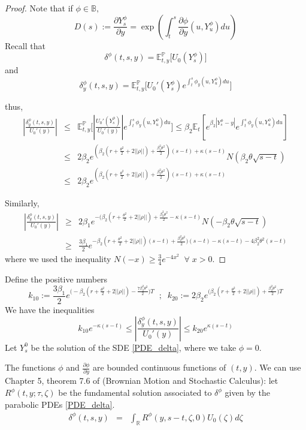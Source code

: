 \documentclass[11pt, psfig]{article}
\theoremstyle{definition}
\theoremstyle{remark}
\numberwithin{equation}{section}
\def\sP{\mathbb{P}}
\def\sR{\mathbb{R}}
\def\sR{\mathbb{R}}
\def\sE{\mathbb{E}}
\newcommand{\be}{\begin{equation}}
\newcommand{\ee}{\end{equation}}
\begin{document}
\begin{proof}
Note that if $\phi \in \mathbb{B},$ 
\be
D(s) :=\frac{\partial Y_s^{\phi}}{\partial y} = \exp\left( \int_t^s \frac{ \partial \phi}{\partial y}(u,Y_u^{\phi}) du  \right)
\ee
Recall that $$ \delta^{\phi}(t,s,y) =  \sE_{t,y}^{\sP}\bigg[U_0({Y}^{\phi}_s)\bigg]$$ and
$$ \delta_y^{\phi}(t,s,y) =  \sE_{t,y}^{\sP}\bigg[U_0'({Y}^{\phi}_s)e^{\int_t^s \phi_y(u,Y_u^{\phi})du}\bigg]$$



thus,
\begin{eqnarray*}
| \frac{ \delta_y^{\phi}(t,s,y)}{U_0'(y)} | & \leq &  \sE_{t,y}^{\sP}\bigg[|\frac{U_0'({Y}^{\phi}_s)}{U_0'(y)}| e^{\int_t^s \phi_y(u,Y_u^{\phi})du}\bigg]
\leq  \beta_2\sE_t[ e^{ \beta_2 |Y_s^{\phi} -y | }  e^{\int_t^s \phi_{y} (u, Y_u^{\phi}) du} ] \\
  &\leq &2\beta_2 e^{ (\beta_2 (r+\frac{\theta^2}{2}+2||\rho||) + \frac{\beta_2^2 \theta^2}{2})(s-t)+ \kappa(s-t) }N(\beta_2 \theta\sqrt{s-t}) \\
 &\leq& 2 \beta_2 e^{ (\beta_2 (r+\frac{\theta^2}{2}+2||\rho||) + \frac{\beta_2^2 \theta^2}{2})(s-t)+\kappa (s-t)}
\end{eqnarray*}

Similarly,
\begin{eqnarray*}
| \frac{ \delta_y^{\phi}(t,s,y)}{U_0'(y)} | & \geq & 2\beta_1 e^{ -(\beta_2 (r+\frac{\theta^2}{2}+2||\rho||) + \frac{\beta_2^2 \theta^2}{2}-\kappa (s-t) }  N(-\beta_2 \theta\sqrt{s-t}) \\
 &\geq& \frac{3\beta_1}{2} e^{- \beta_2 (r+\frac{\theta^2}{2}+2||\rho||)(s-t) + \frac{\beta_2^2 \theta^2}{2})(s-t)-\kappa(s-t)-4\beta_2^2\theta^2(s-t)}
 \end{eqnarray*}
 where we used the inequality $N(-x)\geq \frac{3}{4}e^{-4x^2} \;\; \forall \; x>0$.
\end{proof}


Define the positive numbers \be
k_{10} :=  \frac{3\beta_1}{2}e^{ \big(-\beta_2 (r+\frac{\theta^2}{2}+2||\rho||) - \frac{7 \beta_2^2 \theta^2}{2}\big)T}\;\;;\;\;
k_{20} := 2\beta_2  e^{\big (\beta_2 (r+\frac{\theta^2}{2}+2||\rho||) + \frac{\beta_2^2 \theta^2}{2}\big)T}
\ee
We have the inequalities
\be
k_{10} e^{-\kappa (s-t) }\leq |\frac{ \delta_y^{\phi}(t,s,y)}{U_0'(y)} | \leq k_{20} e^{\kappa (s-t)}
\ee
Let $Y_s^0$ be the solution of the SDE \eqref{PDE_delta}, where we take $\phi=0$.


The functions $ \phi$ and $ \frac{\partial \phi}{\partial y} $ are bounded continuous functions of $(t,y)$. We can use Chapter 5, theorem 7.6 of (Brownian Motion and Stochastic Calculus):
let $R^{\phi} (t,y; \tau,\zeta) $  be the fundamental solution associated to $\delta^{\phi}$  given by the parabolic PDEs \eqref{PDE_delta}.
\begin{eqnarray*}
\delta^{\phi}(t,s,y)&=&\int_{\sR} R^{\phi}(y,s-t,\zeta,0) U_0(\zeta)  d\zeta 
\end{eqnarray*}
\end{document}
